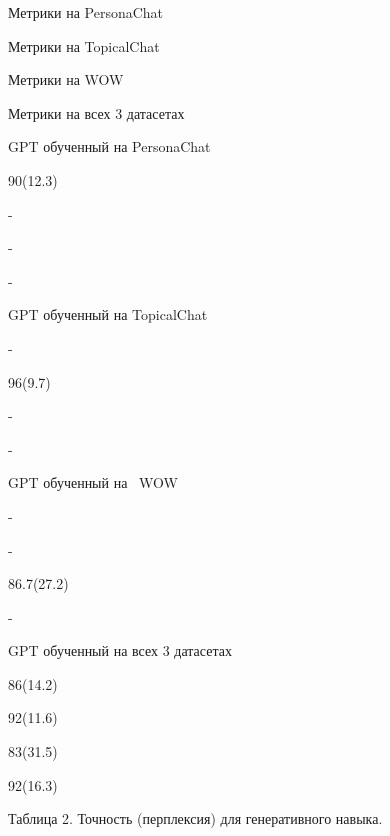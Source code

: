 Метрики на PersonaChat

Метрики на TopicalChat

Метрики на WOW

Метрики на всех 3 датасетах

GPT обученный на PersonaChat

90(12.3)

-

-

-

GPT обученный на TopicalChat

-

96(9.7)

-

-

GPT обученный на  WOW

-

-

86.7(27.2)

-

GPT обученный на всех 3 датасетах

86(14.2)

92(11.6)

83(31.5)

92(16.3)

Таблица 2. Точность (перплексия) для генеративного навыка.

